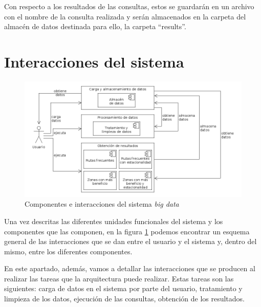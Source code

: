 Con respecto a los resultados de las consultas, estos se guardarán en un archivo con el nombre de la consulta realizada y serán almacenados en la carpeta del almacén de datos destinada para ello, la carpeta ``results''.

\section{Interacciones del sistema}
\begin{figure}[htp!]
\centering
\caption{Componentes e interacciones del sistema \textit{big data}}
\label{fig:interacciones}
\includegraphics[scale=0.52]{diagramas/interacciones}
\end{figure}

Una vez descritas las diferentes unidades funcionales del sistema y los componentes que las componen, en la figura \ref{fig:interacciones} podemos encontrar un esquema general de las interacciones que se dan entre el usuario y el sistema y, dentro del mismo, entre los diferentes componentes.

En este apartado, además, vamos a detallar las interacciones que se producen al realizar las tareas que la arquitectura puede realizar. Estas tareas son las siguientes: carga de datos en el sistema por parte del usuario, tratamiento y limpieza de los datos, ejecución de las consultas, obtención de los resultados.

